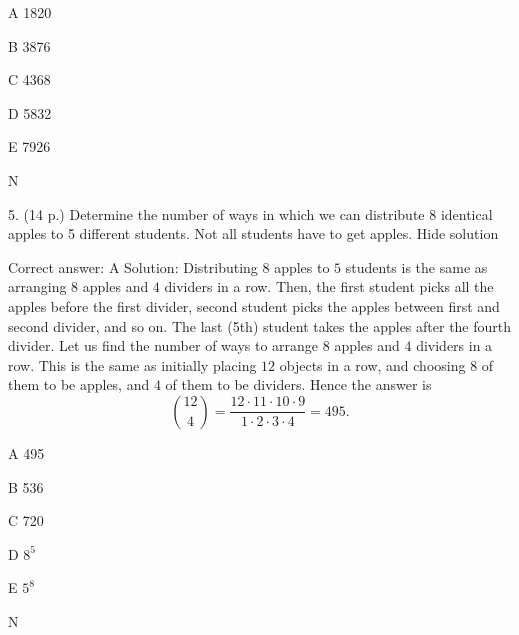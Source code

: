   A    1820

   B    3876

   C    4368

   D    5832

   E    7926

   N
	

5.	(14 p.)
	Determine the number of ways in which we can distribute 8 identical apples to 5 different students. Not all students have to get apples.
Hide solution

Correct answer: A
Solution: Distributing \( 8 \) apples to \( 5 \) students is the same as arranging \( 8 \) apples and \( 4 \) dividers in a row. Then, the first student picks all the apples before the first divider, second student picks the apples between first and second divider, and so on. The last (5th) student takes the apples after the fourth divider. Let us find the number of ways to arrange \( 8 \) apples and \( 4 \) dividers in a row. This is the same as initially placing \( 12 \) objects in a row, and choosing \( 8 \) of them to be apples, and \( 4 \) of them to be dividers. Hence the answer is \[ \binom{12}{4}=\frac{12\cdot 11\cdot 10\cdot 9}{1\cdot 2\cdot 3\cdot 4}=495.\]

   A    495

   B    536

   C    720

   D    \( 8^5 \)

   E    \( 5^8 \)

   N    